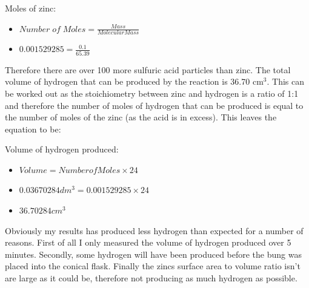 Moles of zinc:
\begin{itemize}
\item $Number \; of \; Moles = \frac{Mass}{Molecular Mass}$
\item $0.001529285 = \frac{0.1}{65.39}$
\end{itemize}

Therefore there are over 100 more sulfuric acid particles than zinc. The total volume of hydrogen that can be produced by the reaction is 36.70 cm$^3$. This can be worked out as the stoichiometry between zinc and hydrogen is a ratio of 1:1 and therefore the number of moles of hydrogen that can be produced is equal to the number of moles of the zinc (as the acid is in excess). This leaves the equation to be:

Volume of hydrogen produced:
\begin{itemize}
\item $Volume = Number of Moles \times 24$
\item $0.03670284 dm^3 = 0.001529285 \times 24$
\item $36.70284 cm^3$
\end{itemize}

Obviously my results has produced less hydrogen than expected for a number of reasons. First of all I only measured the volume of hydrogen produced over 5 minutes. Secondly, some hydrogen will have been produced before the bung was placed into the conical flask. Finally the zincs surface area to volume ratio isn't are large as it could be, therefore not producing as much hydrogen as possible.

